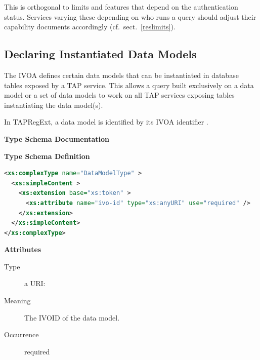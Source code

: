 \documentclass{ivoa}
\begin{document}
This is orthogonal to limits and features that depend on the
authentication status.  Services varying these depending on who runs a
query should adjust their capability documents accordingly
(cf.~sect.~\ref{reslimits}).

\subsection{Declaring Instantiated Data Models}

\label{dms}

The IVOA defines certain data models that can be instantiated in database
tables exposed by a TAP service.  This allows a query built exclusively
on a data model or a set of data models to work on all TAP services exposing
tables instantiating the data model(s).

In TAPRegExt, a data model is identified by its IVOA identifier
\citep{2016ivoa.spec.0523D}.

\begin{generated}
\begingroup
        \renewcommand*\descriptionlabel[1]{%
        \hbox to 5.5em{\emph{#1}\hfil}}\vspace{2ex}\noindent\textbf{ Type Schema Documentation}


\vspace{1ex}\noindent\textbf{ Type Schema Definition}

\begin{lstlisting}[language=XML,basicstyle=\footnotesize]
<xs:complexType name="DataModelType" >
  <xs:simpleContent >
    <xs:extension base="xs:token" >
      <xs:attribute name="ivo-id" type="xs:anyURI" use="required" />
    </xs:extension>
  </xs:simpleContent>
</xs:complexType>
\end{lstlisting}

\vspace{0.5ex}\noindent\textbf{ Attributes}

\begingroup\small\begin{bigdescription}
\item[ivo-id]
\begin{description}
\item[Type] a URI: 
\item[Meaning] The IVOID of the data model.
\item[Occurrence] required
\end{description}


\end{bigdescription}\endgroup

\endgroup
\end{generated}
\end{document}
